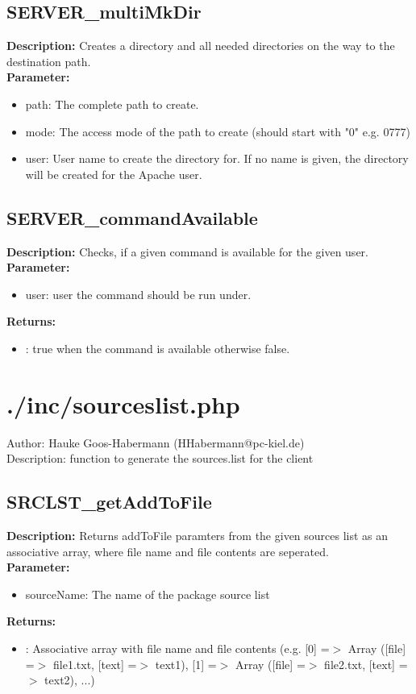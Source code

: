 \subsection{SERVER\_multiMkDir}
\textbf{Description:} Creates a directory and all needed directories on the way to the destination path.\\
\textbf{Parameter:}
\begin{itemize}
\item path: The complete path to create.
\item mode: The access mode of the path to create (should start with "0" e.g. 0777)
\item user: User name to create the directory for. If no name is given, the directory will be created for the Apache user.
\end{itemize}

\subsection{SERVER\_commandAvailable}
\textbf{Description:} Checks, if a given command is available for the given user.\\
\textbf{Parameter:}
\begin{itemize}
\item user: user the command should be run under.
\end{itemize}
\textbf{Returns:}
\begin{itemize}
\item : true when the command is available otherwise false.
\end{itemize}

\newpage\section{./inc/sourceslist.php}
 Author: Hauke Goos-Habermann (HHabermann@pc-kiel.de)\\
 Description: function to generate the sources.list for the client\\

\subsection{SRCLST\_getAddToFile}
\textbf{Description:} Returns addToFile paramters from the given sources list as an associative array, where file name and file contents are seperated.\\
\textbf{Parameter:}
\begin{itemize}
\item sourceName: The name of the package source list
\end{itemize}
\textbf{Returns:}
\begin{itemize}
\item : Associative array with file name and file contents (e.g. [0] =$>$ Array ([file] =$>$ file1.txt, [text] =$>$ text1), [1] =$>$ Array ([file] =$>$ file2.txt, [text] =$>$ text2), ...)
\end{itemize}

